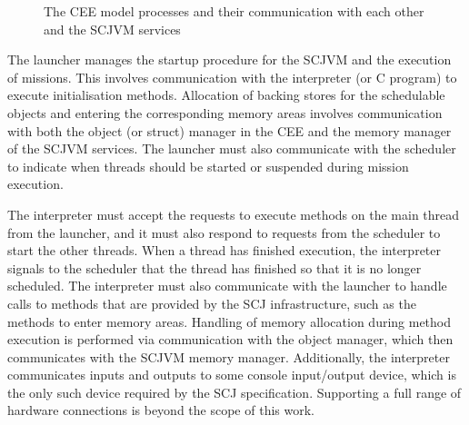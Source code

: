 \begin{figure}[ht]
  \centering
  \caption{The CEE model processes and their communication with each
    other and the SCJVM services}
  \label{cee-model-fig}
\end{figure}

The launcher manages the startup procedure for the SCJVM and the
execution of missions.
This involves communication with the interpreter (or C program) to
execute initialisation methods.
Allocation of backing stores for the schedulable objects and entering
the corresponding memory areas involves communication with both the
object (or struct) manager in the CEE and the memory manager of the
SCJVM services.
The launcher must also communicate with the scheduler to indicate when
threads should be started or suspended during mission execution.

The interpreter must accept the requests to execute methods on the
main thread from the launcher, and it must also respond to requests
from the scheduler to start the other threads.
When a thread has finished execution, the interpreter signals to the
scheduler that the thread has finished so that it is no longer
scheduled.
The interpreter must also communicate with the launcher to handle
calls to methods that are provided by the SCJ infrastructure, such as
the methods to enter memory areas.
Handling of memory allocation during method execution is performed via
communication with the object manager, which then communicates with
the SCJVM memory manager.
Additionally, the interpreter communicates inputs and outputs to some
console input/output device, which is the only such device required by
the SCJ specification.
Supporting a full range of hardware connections is beyond the scope of
this work.

